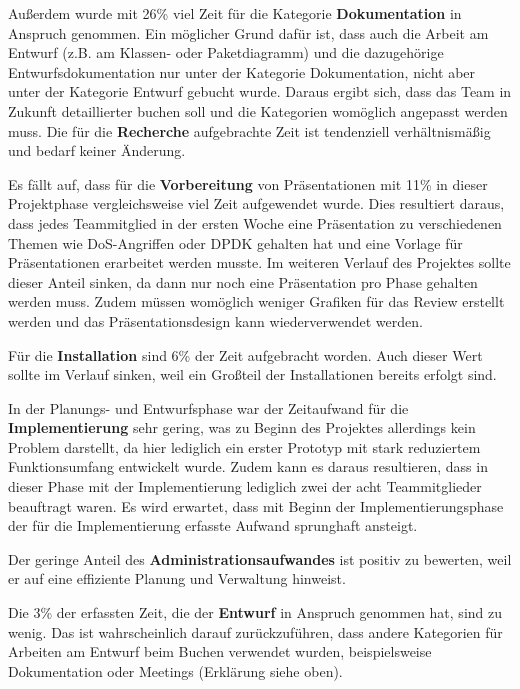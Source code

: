 \documentclass[../review_3.tex]{subfiles}
\begin{document}
Außerdem wurde mit 26\% viel Zeit für die Kategorie \textbf{Dokumentation} in Anspruch genommen. Ein möglicher Grund dafür ist, dass auch die Arbeit am Entwurf (z.B. am Klassen- oder Paketdiagramm) und die dazugehörige Entwurfsdokumentation nur unter der Kategorie Dokumentation, nicht aber unter der Kategorie Entwurf gebucht wurde. Daraus ergibt sich, dass das Team in Zukunft detaillierter buchen soll und die Kategorien womöglich angepasst werden muss.
Die für die \textbf{Recherche} aufgebrachte Zeit ist tendenziell verhältnismäßig und bedarf keiner Änderung.

Es fällt auf, dass für die \textbf{Vorbereitung} von Präsentationen  mit 11\% in dieser Projektphase vergleichsweise viel Zeit aufgewendet wurde. Dies resultiert daraus, dass jedes Teammitglied in der ersten Woche eine Präsentation zu verschiedenen Themen wie DoS-Angriffen oder DPDK gehalten hat und eine Vorlage für Präsentationen erarbeitet werden musste. Im weiteren Verlauf des Projektes sollte dieser Anteil sinken, da dann nur noch eine Präsentation pro Phase gehalten werden muss. Zudem müssen womöglich weniger Grafiken für das Review erstellt werden und das Präsentationsdesign kann wiederverwendet werden.

Für die \textbf{Installation} sind 6\% der Zeit aufgebracht worden. Auch dieser Wert sollte im Verlauf sinken, weil ein Großteil der Installationen bereits erfolgt sind.

In der Planungs- und Entwurfsphase war der Zeitaufwand für die \textbf{Implementierung} sehr gering, was zu Beginn des Projektes allerdings kein Problem darstellt, da hier lediglich ein erster Prototyp mit stark reduziertem Funktionsumfang entwickelt wurde. Zudem kann es daraus resultieren, dass in dieser Phase mit der Implementierung lediglich zwei der acht Teammitglieder beauftragt waren. Es wird erwartet, dass mit Beginn der Implementierungsphase der für die Implementierung erfasste Aufwand sprunghaft ansteigt.

Der geringe Anteil des \textbf{Administrationsaufwandes} ist positiv zu bewerten, weil er auf eine effiziente Planung und Verwaltung hinweist.

Die 3\% der erfassten Zeit, die der \textbf{Entwurf} in Anspruch genommen hat, sind zu wenig. Das ist wahrscheinlich darauf zurückzuführen, dass andere Kategorien für Arbeiten am Entwurf beim Buchen verwendet wurden, beispielsweise Dokumentation oder Meetings (Erklärung siehe oben).
\end{document}

